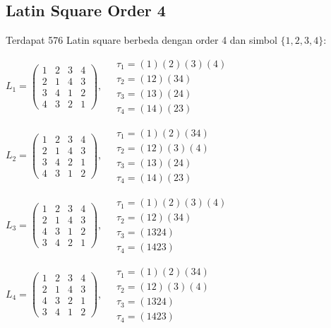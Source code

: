 
\subsection*{Latin Square Order 4}

Terdapat 576 Latin square berbeda dengan order 4 dan simbol $\{1, 2, 3, 4\}$:

$L_{1} = \begin{pmatrix} 1 & 2 & 3 & 4 \\ 2 & 1 & 4 & 3 \\ 3 & 4 & 1 & 2 \\ 4 & 3 & 2 & 1 \end{pmatrix}, \quad \begin{matrix} \tau_{1} = (1)(2)(3)(4) \\ \tau_{2} = (1 2)(3 4) \\ \tau_{3} = (1 3)(2 4) \\ \tau_{4} = (1 4)(2 3) \end{matrix}$

$L_{2} = \begin{pmatrix} 1 & 2 & 3 & 4 \\ 2 & 1 & 4 & 3 \\ 3 & 4 & 2 & 1 \\ 4 & 3 & 1 & 2 \end{pmatrix}, \quad \begin{matrix} \tau_{1} = (1)(2)(3 4) \\ \tau_{2} = (1 2)(3)(4) \\ \tau_{3} = (1 3)(2 4) \\ \tau_{4} = (1 4)(2 3) \end{matrix}$

$L_{3} = \begin{pmatrix} 1 & 2 & 3 & 4 \\ 2 & 1 & 4 & 3 \\ 4 & 3 & 1 & 2 \\ 3 & 4 & 2 & 1 \end{pmatrix}, \quad \begin{matrix} \tau_{1} = (1)(2)(3)(4) \\ \tau_{2} = (1 2)(3 4) \\ \tau_{3} = (1 3 2 4) \\ \tau_{4} = (1 4 2 3) \end{matrix}$

$L_{4} = \begin{pmatrix} 1 & 2 & 3 & 4 \\ 2 & 1 & 4 & 3 \\ 4 & 3 & 2 & 1 \\ 3 & 4 & 1 & 2 \end{pmatrix}, \quad \begin{matrix} \tau_{1} = (1)(2)(3 4) \\ \tau_{2} = (1 2)(3)(4) \\ \tau_{3} = (1 3 2 4) \\ \tau_{4} = (1 4 2 3) \end{matrix}$

